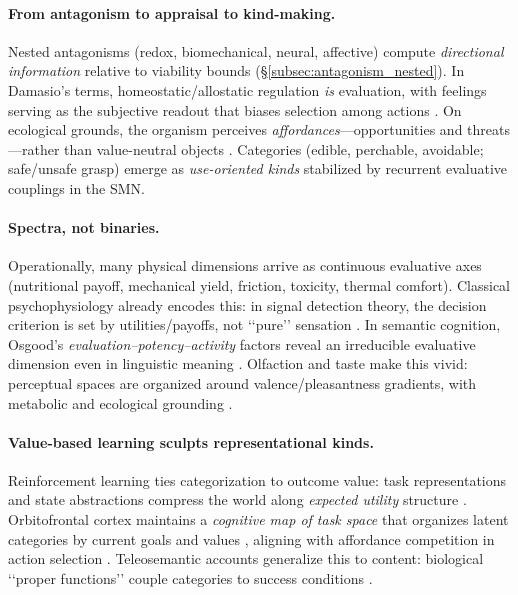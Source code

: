 \paragraph{From antagonism to appraisal to kind-making.}
Nested antagonisms (redox, biomechanical, neural, affective) compute \emph{directional information} relative to viability bounds (\S\ref{subsec:antagonism_nested}). In Damasio’s terms, homeostatic/allostatic regulation \emph{is} evaluation, with feelings serving as the subjective readout that biases selection among actions \citep{Damasio1999_Feeling,Damasio2018_StrangeOrder}. On ecological grounds, the organism perceives \emph{affordances}—opportunities and threats—rather than value-neutral objects \citep{Gibson1979_Ecological}. Categories (edible, perchable, avoidable; safe/unsafe grasp) emerge as \emph{use-oriented kinds} stabilized by recurrent evaluative couplings in the SMN.

\paragraph{Spectra, not binaries.}
Operationally, many physical dimensions arrive as continuous evaluative axes (nutritional payoff, mechanical yield, friction, toxicity, thermal comfort). Classical psychophysiology already encodes this: in signal detection theory, the decision criterion is set by utilities/payoffs, not ‘‘pure’’ sensation \citep{GreenSwets1966_SDT}. In semantic cognition, Osgood’s \emph{evaluation–potency–activity} factors reveal an irreducible evaluative dimension even in linguistic meaning \citep{Osgood1957_MeasurementMeaning}. Olfaction and taste make this vivid: perceptual spaces are organized around valence/pleasantness gradients, with metabolic and ecological grounding \citep{Barwich2020_Smellosophy}.

\paragraph{Value-based learning sculpts representational kinds.}
Reinforcement learning ties categorization to outcome value: task representations and state abstractions compress the world along \emph{expected utility} structure \citep{Niv2009_RLReview}. Orbitofrontal cortex maintains a \emph{cognitive map of task space} that organizes latent categories by current goals and values \citep{Wilson2014_OFCMap}, aligning with affordance competition in action selection \citep{Cisek2007_AffordanceCompetition}. Teleosemantic accounts generalize this to content: biological ‘‘proper functions’’ couple categories to success conditions \citep{Millikan1984_LanguageThought}.

